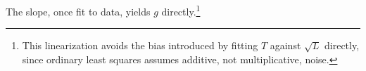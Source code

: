 \documentclass[11pt]{article}
\begin{document}
\begin{abstract}
We measured the local acceleration due to gravity, $g$, by timing the small-angle
oscillations of a simple pendulum of variable length. Using a linear fit of period
squared against length, we obtained $g = 9.79\,\mathrm{m}\,\mathrm{s}^{-2}$, within
$0.2\,\%$ of the accepted value of $9.81\,\mathrm{m}\,\mathrm{s}^{-2}$. Sources
of systematic error, including air resistance and finite string mass, are discussed in
Section~4.
\end{abstract}

The slope, once fit to data, yields $g$ directly.\footnote{This linearization avoids the
bias introduced by fitting $T$ against $\sqrt{L}$ directly, since ordinary least squares
assumes additive, not multiplicative, noise.}
\end{document}
